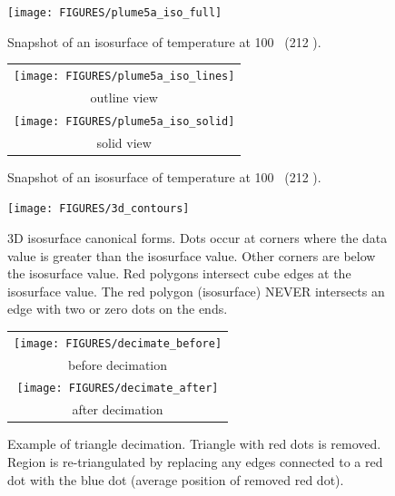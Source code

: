 \documentclass[11pt,twoside]{book}
\begin{document}
\begin{figure}[\figoptions]
\begin{center}
\texttt{[image: FIGURES/plume5a\_iso\_full]}\\
\end{center}
\caption{Snapshot of an isosurface of temperature at 100 \degC\ (212 \degF).
  }
\label{figisoa}%
\end{figure}

\begin{figure}[\figoptions]
\begin{center}
\begin{tabular}{c}
\texttt{[image: FIGURES/plume5a\_iso\_lines]}\\
outline view\\
\texttt{[image: FIGURES/plume5a\_iso\_solid]}\\
solid view
\end{tabular}
\end{center}
\caption{Snapshot of an isosurface of temperature at 100 \degC\ (212 \degF).
  }
\label{figisob}%
\end{figure}

\begin{figure}[\figoptions]
\begin{center}
\texttt{[image: FIGURES/3d\_contours]}
\end{center}
\caption[3D isosurface canonical forms.]{3D isosurface canonical forms.
Dots occur at corners where the data value is greater than the isosurface value.  Other corners are below the isosurface value.  Red polygons intersect cube edges at the isosurface value.  The red polygon (isosurface) NEVER intersects an edge with two or zero dots on the ends.
  }
\label{figisosetup}%
\end{figure}


\begin{figure}[\figoptions]
\begin{center}
\begin{tabular}{c}
\texttt{[image: FIGURES/decimate\_before]}\\
before decimation\\
\texttt{[image: FIGURES/decimate\_after]}\\
after decimation
\end{tabular}
\end{center}
\caption[Example of triangle decimation.]{Example of triangle decimation.  Triangle with red dots is removed.  Region is re-triangulated by replacing any edges connected to a red dot with the blue dot (average position of removed red dot).}
\label{figdecimate}%
\end{figure}
\end{document}
